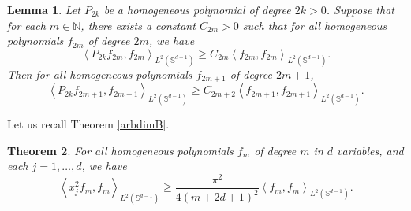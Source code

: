 \documentclass[12pt]{amsart}
\newtheorem{theorem}{Theorem}
\newtheorem{lemma}[theorem]{Lemma}
\begin{document}
\begin{lemma}
\label{Lemevenodd} Let $P_{2k}$ be a homogeneous polynomial of degree $2k>0$.
 Suppose that for each $m\in \mathbb{N}$, there exists a constant $
C_{2m}>0$ such that for all homogeneous polynomials $f_{2m}$ of degree $2m$, we have
\begin{equation*}
\left\langle P_{2k}f_{2m},f_{2m}\right\rangle _{L^{2}(\mathbb{S}^{d-1})}\geq
C_{2m}\left\langle f_{2m},f_{2m}\right\rangle _{L^{2}(\mathbb{S}^{d-1})}.
\end{equation*}
Then for all homogeneous polynomials $f_{2m+1}$ of degree $2m+1$, 
\begin{equation*}
\left\langle P_{2k}f_{2m+1},f_{2m+1}\right\rangle _{L^{2}(\mathbb{S}
^{d-1})}\geq C_{2m+2}\left\langle f_{2m+1},f_{2m+1}\right\rangle _{L^{2}(
\mathbb{S}^{d-1})}.
\end{equation*}

\end{lemma}

Let us recall Theorem \ref{arbdimB}.

\begin{theorem} \label{arbdimBB}
	For all homogeneous polynomials $
	f_{m}$ of degree $m$ in $d$ variables, 
	and each $j = 1, \dots , d$, we have
	\begin{equation*}
		\left\langle x_{j}^{2}f_{m},f_{m}\right\rangle _{L^{2}\left( \mathbb{S}%
			^{d-1}\right) }
		\geq
		\frac{\pi ^{2}}{4\left( m+ 2 d + 1 \right)^{2}}
		\left
		\langle
		f_{m},f_{m}\right\rangle _{L^{2}\left( \mathbb{S}^{d-1}\right) }.
	\end{equation*}
\end{theorem}
\end{document}
